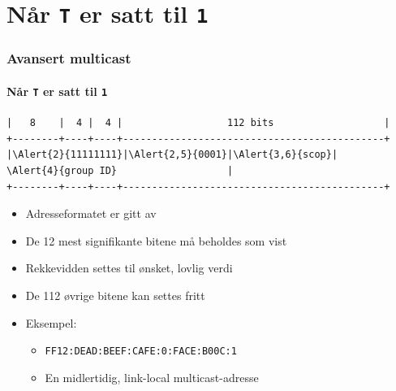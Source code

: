 \section{Når \texttt{T} er satt til \texttt{1}}
\begin{frame}[fragile]%
  \frametitle{Avansert multicast}
  \framesubtitle{Når \texttt{T} er satt til \texttt{1}}
\begin{Verbatim}[commandchars=\\\{\},fontsize=\tiny]
|   8    |  4 |  4 |                  112 bits                   |
+--------+----+----+---------------------------------------------+
|\Alert{2}{11111111}|\Alert{2,5}{0001}|\Alert{3,6}{scop}|                  \Alert{4}{group ID}                   |
+--------+----+----+---------------------------------------------+
\end{Verbatim}
  \begin{itemize}%
  \item Adresseformatet er gitt av 
  \item \alert<2>{De 12 mest signifikante bitene} må beholdes som vist
  \item \alert<3>{Rekkevidden} settes til ønsket, lovlig verdi
  \item \alert<4>{De 112 øvrige bitene} kan settes fritt
  \item Eksempel:
    \begin{itemize}%
    \item \texttt{FF\alert<5>{1}\alert<6>{2}:DEAD:BEEF:CAFE:0:FACE:B00C:1}
    \item En \alert<5>{midlertidig}, \alert<6>{link-local} multicast-adresse
    \end{itemize}
  \end{itemize}
\end{frame}

